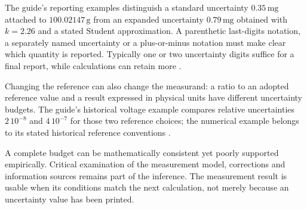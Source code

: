 The guide's reporting examples distinguish a standard uncertainty
\(0.35\,\mathrm{mg}\) attached to \(100.02147\,\mathrm g\) from an expanded
uncertainty \(0.79\,\mathrm{mg}\) obtained with \(k=2.26\) and a stated
Student approximation. A parenthetic last-digits notation, a separately
named uncertainty or a plus-or-minus notation must make clear which quantity
is reported. Typically one or two uncertainty digits suffice for a final
report, while calculations can retain more \cite[7.2]{JCGM1002008EMeasurement}.

Changing the reference can also change the measurand: a ratio to an adopted
reference value and a result expressed in physical units have different
uncertainty budgets. The guide's historical voltage example compares
relative uncertainties \(2\,10^{-8}\) and \(4\,10^{-7}\) for those two
reference choices; the numerical example belongs to its stated historical
reference conventions \cite[3.4.6]{JCGM1002008EMeasurement}.

A complete budget can be mathematically consistent yet poorly supported
empirically. Critical examination of the measurement model, corrections and
information sources remains part of the inference. The measurement result
is usable when its conditions match the next calculation, not merely because
an uncertainty value has been printed.

